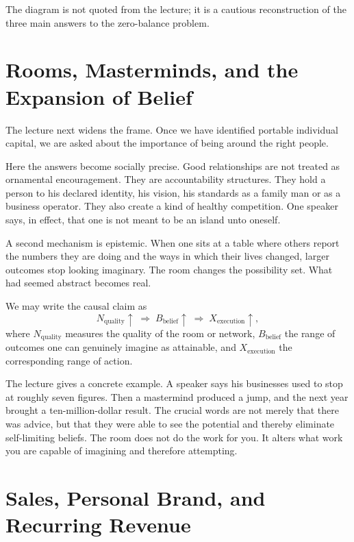 The diagram is not quoted from the lecture; it is a cautious reconstruction of the three main answers to the zero-balance problem.

\section{Rooms, Masterminds, and the Expansion of Belief}

The lecture next widens the frame. Once we have identified portable individual capital, we are asked about the importance of being around the right people.

Here the answers become socially precise. Good relationships are not treated as ornamental encouragement. They are accountability structures. They hold a person to his declared identity, his vision, his standards as a family man or as a business operator. They also create a kind of healthy competition. One speaker says, in effect, that one is not meant to be an island unto oneself.

A second mechanism is epistemic. When one sits at a table where others report the numbers they are doing and the ways in which their lives changed, larger outcomes stop looking imaginary. The room changes the possibility set. What had seemed abstract becomes real.

We may write the causal claim as
\begin{equation}
N_{\mathrm{quality}} \uparrow
\;\Longrightarrow\;
B_{\mathrm{belief}} \uparrow
\;\Longrightarrow\;
X_{\mathrm{execution}} \uparrow,
\end{equation}
where \(N_{\mathrm{quality}}\) measures the quality of the room or network, \(B_{\mathrm{belief}}\) the range of outcomes one can genuinely imagine as attainable, and \(X_{\mathrm{execution}}\) the corresponding range of action.

The lecture gives a concrete example. A speaker says his businesses used to stop at roughly seven figures. Then a mastermind produced a jump, and the next year brought a ten-million-dollar result. The crucial words are not merely that there was advice, but that they were able to see the potential and thereby eliminate self-limiting beliefs. The room does not do the work for you. It alters what work you are capable of imagining and therefore attempting.

\section{Sales, Personal Brand, and Recurring Revenue}

